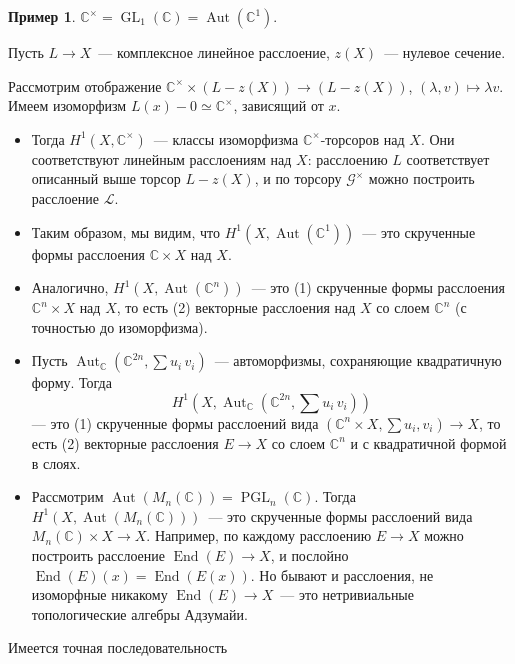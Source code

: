 \documentclass[a4paper]{article}
\DeclareMathOperator{\End}{End}
\DeclareMathOperator{\Aut}{Aut}
\DeclareMathOperator{\PGL}{PGL}
\DeclareMathOperator{\GL}{GL}
\newcommand{\isom}{\simeq}
\theoremstyle{definition}
\newtheorem{example}[theorem]{Пример}
\begin{document}
\begin{example}
$\mathbb{C}^\times = \GL_1 (\mathbb{C}) = \Aut (\mathbb{C}^1)$.

Пусть $L \to X$~--- комплексное линейное расслоение, $z (X)$~---
нулевое сечение.

Рассмотрим отображение $\mathbb{C}^\times \times (L - z(X))\to (L -
z(X))$, $(\lambda, v)\mapsto \lambda v$. Имеем изоморфизм $L(x) -
0\isom \mathbb{C}^\times$, зависящий
от $x$.

\begin{itemize}
\item Тогда $H^1 (X,\mathbb{C}^\times)$~--- классы изоморфизма
  $\mathbb{C}^\times$-торсоров над $X$. Они соответствуют линейным
  расслоениям над $X$: расслоению $L$ соответствует описанный выше
  торсор $L - z(X)$, и по торсору $\mathcal G^\times$ можно построить
  расслоение $\mathcal L$.

\item Таким образом, мы видим, что $H^1 (X, \Aut (\mathbb{C}^1))$~---
  это скрученные формы расслоения
  $\mathbb{C}\times X$ над $X$.

\item Аналогично, $H^1 (X, \Aut (\mathbb{C}^n))$~--- это (1) скрученные формы
  расслоения $\mathbb{C}^n\times X$ над $X$, то есть (2) векторные
  расслоения над $X$ со слоем $\mathbb{C}^n$ (с точностью до изоморфизма).

\item Пусть $\Aut_{\mathbb{C}} (\mathbb{C}^{2n}, \sum u_i\,v_i)$~---
  автоморфизмы, сохраняющие квадратичную форму.
  Тогда \[H^1 (X, \Aut_{\mathbb{C}} (\mathbb{C}^{2n}, \sum
  u_i\,v_i))\]--- это (1) скрученные формы расслоений вида
  $(\mathbb{C}^n\times X, \sum u_i,v_i) \to X$, то есть (2) векторные
  расслоения $E \to X$ со слоем $\mathbb{C}^n$ и с квадратичной формой в
  слоях.

\item Рассмотрим $\Aut (M_n (\mathbb{C})) = \PGL_n
  (\mathbb{C})$. Тогда $H^1 (X, \Aut (M_n (\mathbb{C})))$~--- это
  скрученные формы расслоений вида $M_n (\mathbb{C})\times X \to
  X$. Например, по каждому расслоению $E\to X$ можно построить
  расслоение $\End(E)\to X$, и послойно $\End(E)(x)=\End(E(x))$. Но
  бывают и расслоения, не изоморфные никакому $\End(E)\to X$~--- это
  нетривиальные топологические алгебры Адзумайи.
\end{itemize}
\end{example}

Имеется точная последовательность
\end{document}
